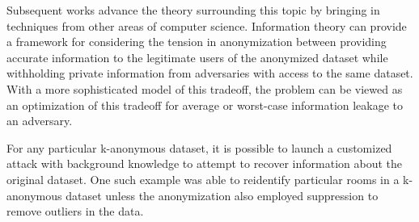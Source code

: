 Subsequent works advance the theory surrounding this topic by bringing in techniques from other areas of computer science. Information theory can provide a framework for considering the tension in anonymization between providing accurate information to the legitimate users of the anonymized dataset while withholding private information from adversaries with access to the same dataset\cite{liuInfoTheory}. With a more sophisticated model of this tradeoff, the problem can be viewed as an optimization of this tradeoff for average or worst-case information leakage to an adversary\cite{duInfoTheory}.

For any particular k-anonymous dataset, it is possible to launch a customized attack with background knowledge to attempt to recover information about the original dataset. One such example \cite{schweeEval} was able to reidentify particular rooms in a k-anonymous dataset unless the anonymization also employed suppression to remove outliers in the data.

